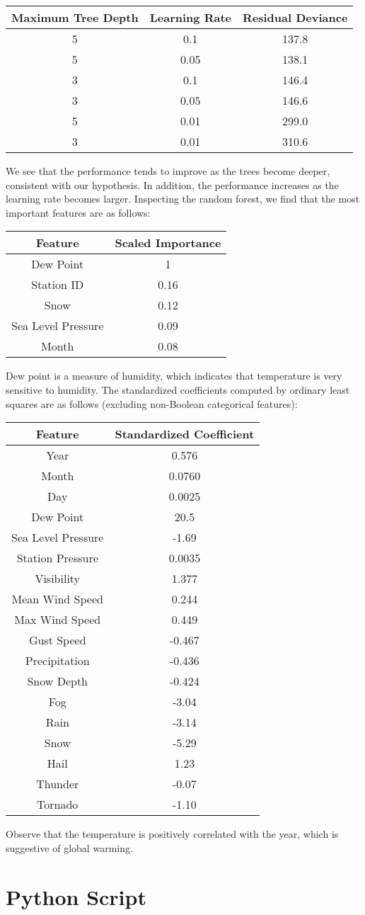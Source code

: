 \documentclass[letterpaper]{article}
\begin{document}
\begin{table}[H]
  \centering
  \begin{tabular}{cc|c}
    Maximum Tree Depth & Learning Rate & Residual Deviance \\ \hline
    5 & 0.1 & 137.8 \\
    5 & 0.05 & 138.1 \\
    3 & 0.1 & 146.4 \\
    3 & 0.05 & 146.6 \\
    5 & 0.01 & 299.0 \\
    3 & 0.01 & 310.6
  \end{tabular}
\end{table}
\noindent
We see that the performance tends to improve as the trees become
deeper, consistent with our hypothesis. In addition, the performance
increases as the learning rate becomes larger.  Inspecting the random
forest, we find that the most important features are as follows:
\begin{table}[H]
  \centering
  \begin{tabular}{c|c}
    Feature & Scaled Importance \\ \hline
    Dew Point & 1 \\
    Station ID & 0.16 \\
    Snow & 0.12 \\
    Sea Level Pressure & 0.09 \\
    Month & 0.08
  \end{tabular}
\end{table}
\noindent
Dew point is a measure of humidity, which indicates that temperature
is very sensitive to humidity.  The standardized coefficients computed
by ordinary least squares are as follows (excluding non-Boolean
categorical features):
\begin{table}[H]
  \centering
  \begin{tabular}{c|c}
    Feature & Standardized Coefficient \\ \hline
    Year & 0.576 \\
    Month & 0.0760 \\
    Day & 0.0025 \\
    Dew Point & 20.5 \\
    Sea Level Pressure & -1.69 \\
    Station Pressure & 0.0035 \\
    Visibility & 1.377 \\
    Mean Wind Speed & 0.244  \\
    Max Wind Speed & 0.449 \\
    Gust Speed & -0.467 \\
    Precipitation & -0.436 \\
    Snow Depth & -0.424 \\
    Fog & -3.04 \\
    Rain & -3.14 \\
    Snow & -5.29 \\
    Hail & 1.23 \\
    Thunder & -0.07 \\
    Tornado & -1.10
  \end{tabular}
\end{table}
\noindent Observe that the temperature is positively correlated with
the year, which is suggestive of global warming.


\appendices
\section{Python Script} \label{appendix:python}

\end{document}
